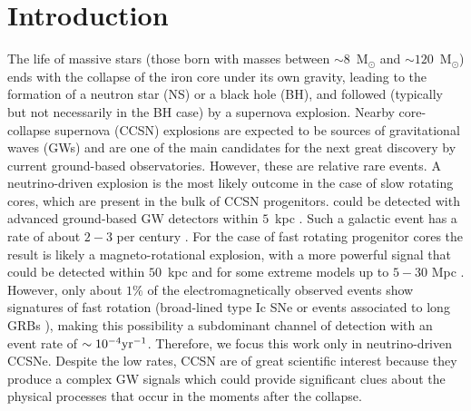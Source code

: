
\section{Introduction}


The life of massive stars {(those born with masses between $\sim 8$~M$_\odot$ and $\sim 120$~M$_\odot$)} ends with the collapse of {the} iron core under {its} own gravity, leading {to} the formation of a neutron star {(NS)} or a black hole (BH), {and} followed (typically but not necessarily in the BH case) by {a supernova} explosion. {Nearby} core-collapse supernova (CCSN) explosions {are expected to be sources of gravitational waves (GWs) and are one of the main candidates for the next great discovery by current ground-based observatories. However, these are relative rare events. A neutrino-driven explosion \citep{Bethe:1990} is the most likely outcome in the case of slow rotating cores, which are present in the bulk of CCSN progenitors.
 could be detected with advanced ground-based GW detectors  within $5$~kpc \citep{Gossan:2016,TargetedSNSearchO12}. Such a galactic event has a rate of about $2-3$ per century \citep{Adams:2013,Rozwadowska:2021}.
For the case of fast rotating progenitor cores the result is likely a magneto-rotational explosion, with } a more powerful  signal {that could} be detected {within $50$~kpc and for some extreme models 
up to $5-30$ Mpc \cite{Gossan:2016,TargetedSNSearchO12}. However, only about $1\%$ of the electromagnetically observed events show signatures of fast rotation (broad-lined type Ic SNe \citep{Li:2011b} or events associated to long GRBs 
\citep{Chapman:2007}), making this possibility a subdominant channel of detection with an event rate of $\sim 10^{-4} \rm{yr}^{-1}$. Therefore, we focus this work only in neutrino-driven CCSNe. 
Despite the low rates, CCSN are of great scientific interest because they produce} a complex GW signals which could provide significant clues about the physical processes that occur in the moments after the collapse. 

